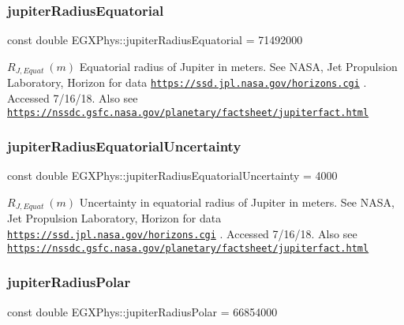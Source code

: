 \subsubsection{\texorpdfstring{jupiter\+Radius\+Equatorial}{jupiterRadiusEquatorial}}
{\footnotesize\ttfamily const double E\+G\+X\+Phys\+::jupiter\+Radius\+Equatorial = 71492000}

$R_{J,Equat} \ (m)$ Equatorial radius of Jupiter in meters. See N\+A\+SA, Jet Propulsion Laboratory, Horizon for data \href{https://ssd.jpl.nasa.gov/horizons.cgi}{\tt https\+://ssd.\+jpl.\+nasa.\+gov/horizons.\+cgi} . Accessed 7/16/18. Also see \href{https://nssdc.gsfc.nasa.gov/planetary/factsheet/jupiterfact.html}{\tt https\+://nssdc.\+gsfc.\+nasa.\+gov/planetary/factsheet/jupiterfact.\+html} \mbox{\label{namespace_e_g_x_phys_a8438593703b79e6685c954b478947faf}} 
\subsubsection{\texorpdfstring{jupiter\+Radius\+Equatorial\+Uncertainty}{jupiterRadiusEquatorialUncertainty}}
{\footnotesize\ttfamily const double E\+G\+X\+Phys\+::jupiter\+Radius\+Equatorial\+Uncertainty = 4000}

$R_{J,Equat} \ (m)$ Uncertainty in equatorial radius of Jupiter in meters. See N\+A\+SA, Jet Propulsion Laboratory, Horizon for data \href{https://ssd.jpl.nasa.gov/horizons.cgi}{\tt https\+://ssd.\+jpl.\+nasa.\+gov/horizons.\+cgi} . Accessed 7/16/18. Also see \href{https://nssdc.gsfc.nasa.gov/planetary/factsheet/jupiterfact.html}{\tt https\+://nssdc.\+gsfc.\+nasa.\+gov/planetary/factsheet/jupiterfact.\+html} \mbox{\label{namespace_e_g_x_phys_ab803b5a7ef7f6dd4a925ebcbc6af61a1}} 
\subsubsection{\texorpdfstring{jupiter\+Radius\+Polar}{jupiterRadiusPolar}}
{\footnotesize\ttfamily const double E\+G\+X\+Phys\+::jupiter\+Radius\+Polar = 66854000}

